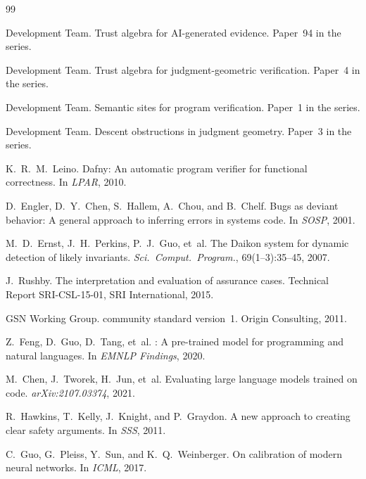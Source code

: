 \documentclass[11pt]{article}
\begin{document}

\begin{thebibliography}{99}

\JuGeo{} Development Team.
\newblock Trust algebra for AI-generated evidence.
\newblock Paper~94 in the \JuGeo{} series.

\JuGeo{} Development Team.
\newblock Trust algebra for judgment-geometric verification.
\newblock Paper~4 in the \JuGeo{} series.

\JuGeo{} Development Team.
\newblock Semantic sites for program verification.
\newblock Paper~1 in the \JuGeo{} series.

\JuGeo{} Development Team.
\newblock Descent obstructions in judgment geometry.
\newblock Paper~3 in the \JuGeo{} series.

K.~R.~M.~Leino.
\newblock Dafny: An automatic program verifier for functional correctness.
\newblock In \emph{LPAR}, 2010.

D.~Engler, D.~Y.~Chen, S.~Hallem, A.~Chou, and B.~Chelf.
\newblock Bugs as deviant behavior: A general approach to inferring errors in
systems code.
\newblock In \emph{SOSP}, 2001.

M.~D.~Ernst, J.~H.~Perkins, P.~J.~Guo, et~al.
\newblock The {D}aikon system for dynamic detection of likely invariants.
\newblock \emph{Sci.~Comput.~Program.}, 69(1--3):35--45, 2007.

J.~Rushby.
\newblock The interpretation and evaluation of assurance cases.
\newblock Technical Report SRI-CSL-15-01, SRI International, 2015.

GSN Working Group.
 community standard version~1.
\newblock Origin Consulting, 2011.

Z.~Feng, D.~Guo, D.~Tang, et~al.
: A pre-trained model for programming and natural languages.
\newblock In \emph{EMNLP Findings}, 2020.

M.~Chen, J.~Tworek, H.~Jun, et~al.
\newblock Evaluating large language models trained on code.
\newblock \emph{arXiv:2107.03374}, 2021.

R.~Hawkins, T.~Kelly, J.~Knight, and P.~Graydon.
\newblock A new approach to creating clear safety arguments.
\newblock In \emph{SSS}, 2011.

C.~Guo, G.~Pleiss, Y.~Sun, and K.~Q.~Weinberger.
\newblock On calibration of modern neural networks.
\newblock In \emph{ICML}, 2017.


\end{thebibliography}
\end{document}
